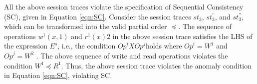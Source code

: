\documentclass[journal,compsoc]{IEEEtran}
\begin{document}
 \par All the above session traces violate the specification of Sequential Consistency (SC), given in Equation
 \ref{eqn:SC}. Consider the session traces $\mathit{st}_3$, $\mathit{st}_3^{'}$, and $\mathit{st}_3^{''}$, which can be transformed into the valid partial order $\preccurlyeq$. %
  The sequence of operations $w^1(x,1)$ and
 $r^1(x){2}$ in the above session trace satisfies the LHS of the expression $E^s$, i.e., the condition
 $\mathit{Op}^i X \mathit{Op}^j $holds where $\mathit{Op}^i = W^1$ and $\mathit{Op}^j = W^2$ . %
  The above sequence of write and read operations
 violates the condition $W^1 \preccurlyeq R^1$.
 Thus, the above session trace violates the anomaly condition in Equation \ref{eqn:SC}, violating SC. 
\end{document}
